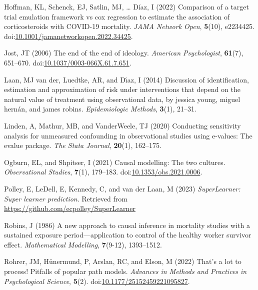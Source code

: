 \documentclass[
  single column]{article}
\newlength{\cslhangindent}
\newenvironment{CSLReferences}[2] %
 {\begin{list}{}{%
  \setlength{\itemindent}{0pt}
  \setlength{\leftmargin}{0pt}
  \setlength{\parsep}{0pt}
  \ifodd #1
   \setlength{\leftmargin}{\cslhangindent}
   \setlength{\itemindent}{-1\cslhangindent}
  \fi
  \setlength{\itemsep}{#2\baselineskip}}}
 {\end{list}}
\begin{document}
\begin{CSLReferences}{1}{0}
Hoffman, KL, Schenck, EJ, Satlin, MJ, \ldots{} Díaz, I (2022) Comparison
of a target trial emulation framework vs cox regression to estimate the
association of corticosteroids with COVID-19 mortality. \emph{JAMA
Network Open}, \textbf{5}(10), e2234425.
doi:\href{https://doi.org/10.1001/jamanetworkopen.2022.34425}{10.1001/jamanetworkopen.2022.34425}.

Jost, JT (2006) The end of the end of ideology. \emph{American
Psychologist}, \textbf{61}(7), 651--670.
doi:\href{https://doi.org/10.1037/0003-066X.61.7.651}{10.1037/0003-066X.61.7.651}.

Laan, MJ van der, Luedtke, AR, and Dı́az, I (2014) Discussion of
identification, estimation and approximation of risk under interventions
that depend on the natural value of treatment using observational data,
by jessica young, miguel hern{á}n, and james robins. \emph{Epidemiologic
Methods}, \textbf{3}(1), 21--31.

Linden, A, Mathur, MB, and VanderWeele, TJ (2020) Conducting sensitivity
analysis for unmeasured confounding in observational studies using
e-values: The evalue package. \emph{The Stata Journal}, \textbf{20}(1),
162--175.

Ogburn, EL, and Shpitser, I (2021) Causal modelling: The two cultures.
\emph{Observational Studies}, \textbf{7}(1), 179--183.
doi:\href{https://doi.org/10.1353/obs.2021.0006}{10.1353/obs.2021.0006}.

Polley, E, LeDell, E, Kennedy, C, and van der Laan, M (2023)
\emph{SuperLearner: Super learner prediction}. Retrieved from
\url{https://github.com/ecpolley/SuperLearner}

Robins, J (1986) A new approach to causal inference in mortality studies
with a sustained exposure period---application to control of the healthy
worker survivor effect. \emph{Mathematical Modelling}, \textbf{7}(9-12),
1393--1512.

Rohrer, JM, Hünermund, P, Arslan, RC, and Elson, M (2022) That's a lot
to process! Pitfalls of popular path models. \emph{Advances in Methods
and Practices in Psychological Science}, \textbf{5}(2).
doi:\href{https://doi.org/10.1177/25152459221095827}{10.1177/25152459221095827}.


\end{CSLReferences}
\end{document}
